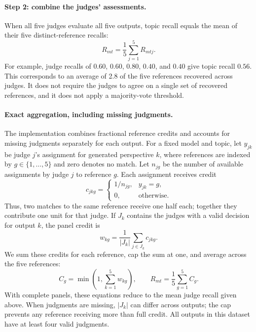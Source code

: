 \paragraph{Step 2: combine the judges' assessments.}
When all five judges evaluate all five outputs, topic recall equals the
mean of their five distinct-reference recalls:
\[
R_{mt}=\frac{1}{5}\sum_{j=1}^{5}R_{mtj}.
\]
For example, judge recalls of $0.60$, $0.60$, $0.80$, $0.40$, and $0.40$
give topic recall $0.56$. This corresponds to an average of 2.8 of the
five references recovered across judges. It does not require the judges
to agree on a single set of recovered references, and it does not apply
a majority-vote threshold.

\paragraph{Exact aggregation, including missing judgments.}
The implementation combines fractional reference credits and accounts for
missing judgments separately for each output. For a fixed model and topic,
let $y_{jk}$ be judge $j$'s assignment for generated perspective $k$,
where references are indexed by $g\in\{1,\ldots,5\}$ and zero denotes
no match. Let $n_{jg}$ be the number of available assignments by judge $j$
to reference $g$. Each assignment receives credit
\begin{equation}
c_{jkg}=\begin{cases}
1/n_{jg}, & y_{jk}=g,\\
0, & \text{otherwise}.
\end{cases}
\label{eq:split-credit}
\end{equation}
Thus, two matches to the same reference receive one half each; together
they contribute one unit for that judge. If $J_k$ contains the judges
with a valid decision for output $k$, the panel credit is
\begin{equation}
w_{kg}=\frac{1}{|J_k|}\sum_{j\in J_k}c_{jkg}.
\label{eq:panel-credit}
\end{equation}
We sum these credits for each reference, cap the sum at one, and average
across the five references:
\begin{equation}
C_g=\min\!\left(1,\sum_{k=1}^{5}w_{kg}\right),
\qquad
R_{mt}=\frac{1}{5}\sum_{g=1}^{5}C_g.
\label{eq:topic-recall}
\end{equation}
With complete panels, these equations reduce to the mean judge recall
given above. When judgments are missing, $|J_k|$ can differ across outputs;
the cap prevents any reference receiving more than full credit. All outputs
in this dataset have at least four valid judgments.

